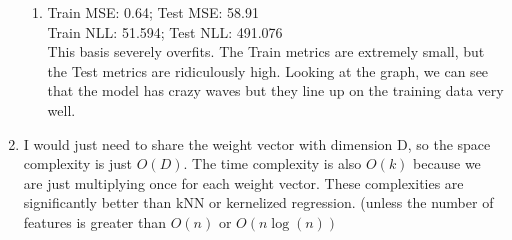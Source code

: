 \documentclass[submit]{harvardml}
\begin{document}
\begin{solution}
\begin{enumerate}
\begin{enumerate}
      \item Train MSE: 0.64; Test MSE: 58.91\\
      Train NLL: 51.594; Test NLL: 491.076\\
      This basis severely overfits. The Train metrics are extremely small, 
      but the Test metrics are ridiculously high. Looking at the graph, we can see that 
      the model has crazy waves but they line up on the training data very well.
    \end{enumerate}
    \item I would just need to share the weight vector with dimension D,
    so the space complexity is just $O(D)$. The time complexity is
    also $O(k)$ because we are just multiplying once for each weight vector.
    These complexities are significantly better than kNN or kernelized regression.
    (unless the number of features is greater than $O(n)$ or $O(n\log(n))$
\end{enumerate}
\end{solution}
\newpage
\end{document}
